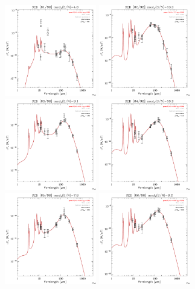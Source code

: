 \documentclass[preprint2,longabstract]{aastex}
\begin{document}
\begin{figure}
\centering
    \includegraphics[trim=0 2mm 0 0, clip, width=40mm]{SEDs/sed_61.pdf}
	\includegraphics[trim=0 2mm 0 0, clip, width=40mm]{SEDs/sed_62.pdf}
	\includegraphics[trim=0 2mm 0 0, clip, width=40mm]{SEDs/sed_63.pdf}
	\includegraphics[trim=0 2mm 0 0, clip, width=40mm]{SEDs/sed_64.pdf}
	\includegraphics[trim=0 2mm 0 0, clip, width=40mm]{SEDs/sed_65.pdf}
	\includegraphics[trim=0 2mm 0 0, clip, width=40mm]{SEDs/sed_66.pdf}

\end{figure}
\end{document}
